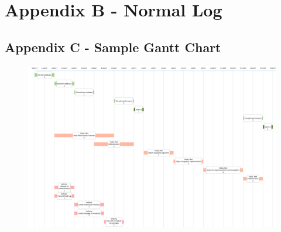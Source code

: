 \documentclass[a4paper,12pt]{article}
\begin{document}
\section*{Appendix B - Normal Log}
\begin{figure}[H]
    \centering
    
    \label{fig:veskolog}
\end{figure}
\newpage
\begin{landscape}
\section*{Appendix C - Sample Gantt Chart}
\begin{figure}[H]
    \centering
    \includegraphics[scale=0.54]{gantt}
    \label{fig:ganttchart}
\end{figure}
\end{landscape}
\end{document}
